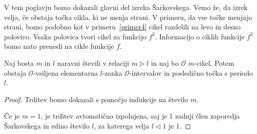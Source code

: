\documentclass[../TG_magistrsko_delo_sections.tex]{subfiles}
\begin{document}
V tem poglavju bomo dokazali glavni del izreka Šarkovskega. Vemo že, da izrek velja, če obstaja točka cikla, ki ne menja strani. V primeru, da vse točke menjajo strani, bomo podobno kot v primeru~\ref{primer4} cikel razdelili na levo in desno polovico. Vsaka polovica tvori cikel za funkcijo $f^2$. Informacijo o ciklih funkcije $f^2$ bomo nato prenesli na cikle funkcije $f$.

\begin{trditev}\label{trd:realcvtm}
Naj bosta $m$ in $l$ naravni števili v relaciji $m \triangleright l$ in naj bo $\mathcal{O}$ $m$-cikel. Potem obstaja $\mathcal{O}$-vsiljena elementarna $l$-zanka $\mathcal{O}$-intervalov in posledično točka s periodo $l$.
\end{trditev}

\begin{proof}
Trditev bomo dokazali s pomočjo indukcije na število $m$. 

Če je $m=1$, je trditev avtomatično izpolnjena, saj je 1 zadnji člen zaporedja Šarkovskega in edino število $l$, za katerega velja $l \triangleleft 1$ je 1. 


\end{proof}
\end{document}
